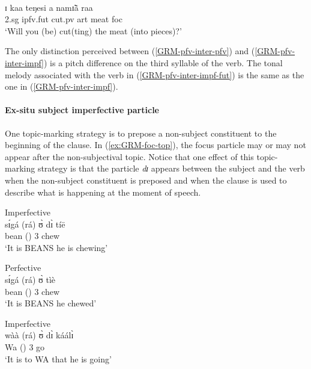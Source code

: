 \begin{exe}
\begin{exe}
\begin{exe}
{\begin{exe}
\begin{exe}
\begin{exe}
\begin{exe}
\begin{exe}
\begin{exe}
\begin{exe}
\begin{xlist}
\begin{exe}
\begin{exe}
\begin{exe}
\begin{exe}
\begin{exe}
\begin{exe}
\begin{exe}
\begin{exe}
\begin{exe}
\begin{exe}
\begin{exe}
\begin{exe}
\begin{exe}
 {\T    } {\T     } {\T    } {\T    } {\T   }\\
ɪ  kaa teŋesi  a  namɪ̃ã  raa \\
          {\sc 2.sg} {\sc ipfv.fut} {cut.{\sc pv}} {\sc art} {meat} {\sc foc}\\
\glt  `Will you (be) cut(ting) the meat (into pieces)?'\\
 
\z 
 \z

The only distinction perceived between (\ref{GRM-pfv-inter-pfv})  and
(\ref{GRM-pfv-inter-impf}) is a pitch difference on the third syllable of the
verb. The tonal melody associated with the verb in 
(\ref{GRM-pfv-inter-impf-fut}) is the
same as the one in (\ref{GRM-pfv-inter-impf}).







\paragraph{Ex-situ subject imperfective particle}
\label{sec:GRM-ipfv-part}

One topic-marking strategy is to prepose a non-subject constituent to the
beginning of the clause.  In  (\ref{ex:GRM-foc-top}),  the focus particle may or
may not
appear after the non-subjectival topic. Notice that one effect of this 
topic-marking strategy is that the particle {\it dɪ} appears between the subject
and
the verb when the non-subject constituent is preposed and when the clause is
used to describe what is happening at the moment of speech. \nolinebreak

\begin{multicols}{2}
\ea\label{ex:GRM-foc-top}
 \ea\label{ex:GRM-foc-top-chew-prog-1}{\rm Imperfective}\\
\gll  sɪ́gá (rá)  ʊ̀ dɪ̀  tíē   \\
 bean  ({\foc}) {3\sg} {\ipfv} chew\\
\glt `It is BEANS he is chewing'


 \ex\label{ex:GRM-foc-top-chew-perf-1}{\rm Perfective}\\
\gll  sɪ́gá (rá) ʊ̀   tìè     \\
 bean  ({\foc}) {3\sg}  chew \\
\glt `It is BEANS he chewed'

 \ex\label{ex:GRM-foc-top-go-prog-2}{\rm Imperfective}\\
\gll   wàà (rá) ʊ̀ dɪ̀  káálɪ̀   \\
Wa    ({\foc}) {3\sg} {\ipfv} go\\
\glt `It is to WA that he is going'



\end{multicols}
\end{exe}
\end{exe}
\end{exe}
\end{exe}
\end{exe}
\end{exe}
\end{exe}
\end{exe}
\end{exe}
\end{exe}
\end{exe}
\end{exe}
\end{exe}
\end{xlist}
\end{exe}
\end{exe}
\end{exe}
\end{exe}
\end{exe}
\end{exe}
\end{exe}}
\end{exe}
\end{exe}
\end{exe}
